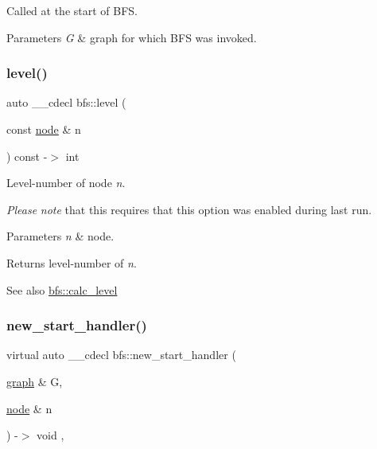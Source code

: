 Called at the start of B\+FS. 


\begin{DoxyParams}{Parameters}
{\em G} & graph for which B\+FS was invoked. \\
\hline
\end{DoxyParams}
\mbox{\label{classbfs_a9c2effb945b67f73b3abe33682df139f}} 
\subsubsection{\texorpdfstring{level()}{level()}}
{\footnotesize\ttfamily auto \+\_\+\+\_\+cdecl bfs\+::level (\begin{DoxyParamCaption}\item[{const \mbox{\hyperlink{classnode}{node}} \&}]{n }\end{DoxyParamCaption}) const -\/$>$ int
	\hspace{0.3cm}{\ttfamily [inline]}}



Level-\/number of node {\itshape n}. 

{\itshape Please} {\itshape note} that this requires that this option was enabled during last run.


\begin{DoxyParams}{Parameters}
{\em n} & node. \\
\hline
\end{DoxyParams}
\begin{DoxyReturn}{Returns}
level-\/number of {\itshape n}. 
\end{DoxyReturn}
\begin{DoxySeeAlso}{See also}
\mbox{\hyperlink{classbfs_aa02df0b00c5fbaa29b9a41a211732e0f}{bfs\+::calc\+\_\+level}} 
\end{DoxySeeAlso}
\mbox{\label{classbfs_ab4b0ac22769cedc2a45e72efb3dd5565}} 
\subsubsection{\texorpdfstring{new\+\_\+start\+\_\+handler()}{new\_start\_handler()}}
{\footnotesize\ttfamily virtual auto \+\_\+\+\_\+cdecl bfs\+::new\+\_\+start\+\_\+handler (\begin{DoxyParamCaption}\item[{\mbox{\hyperlink{classgraph}{graph}} \&}]{G,  }\item[{\mbox{\hyperlink{classnode}{node}} \&}]{n }\end{DoxyParamCaption}) -\/$>$ void \hspace{0.3cm}{\ttfamily [inline]}, {\ttfamily [virtual]}}



